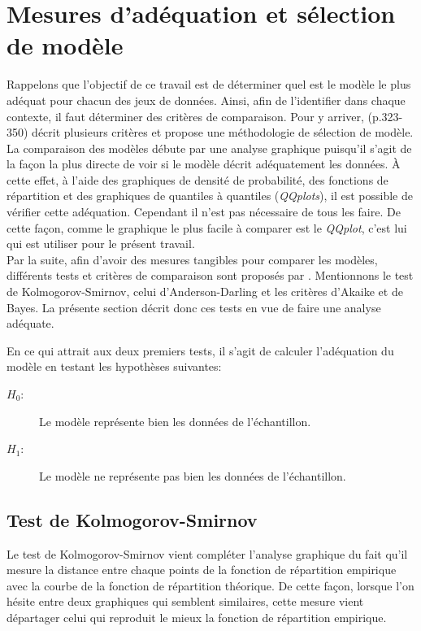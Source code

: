 \section{Mesures d'adéquation et sélection de modèle }\label{Sect_Adequation}	
Rappelons que l'objectif de ce travail est de déterminer quel est le modèle le plus adéquat pour chacun des jeux de données. Ainsi, afin de l'identifier dans chaque contexte, il faut déterminer des critères de comparaison. Pour y arriver, \cite{LossModels_Klugman2012}(p.323-350) décrit plusieurs critères et propose une méthodologie de sélection de modèle.\\

La comparaison des modèles débute par une analyse graphique puisqu'il s'agit de la façon la plus directe de voir si le modèle décrit adéquatement les données. À cette effet, à l'aide des graphiques de densité de probabilité, des fonctions de répartition et des graphiques de quantiles à quantiles (\textit{QQplots}), il est possible de vérifier cette adéquation. Cependant il n'est pas nécessaire de tous les faire. De cette façon, comme le graphique le plus facile à comparer est le \textit{QQplot}, c'est lui qui est utiliser pour le présent travail.\\

Par la suite, afin d'avoir des mesures tangibles pour comparer les modèles, différents tests et critères de comparaison sont proposés par \cite{LossModels_Klugman2012}. Mentionnons le test de Kolmogorov-Smirnov, celui d'Anderson-Darling et les critères d'Akaike et de Bayes. La présente section décrit donc ces tests en vue de faire une analyse adéquate.

En ce qui attrait aux deux premiers tests, il s'agit de calculer l'adéquation du modèle en testant les hypothèses suivantes:
\begin{description}
	\item[$H_0$:] Le modèle représente bien les données de l'échantillon.
	\item[$H_1$:] Le modèle ne représente pas bien les données de l'échantillon.\\
\end{description}

\subsection{Test de Kolmogorov-Smirnov}
Le test de Kolmogorov-Smirnov vient compléter l'analyse graphique du fait qu'il mesure la distance entre chaque points de la fonction de répartition empirique avec la courbe de la fonction de répartition théorique. De cette façon, lorsque l'on hésite entre deux graphiques qui semblent similaires, cette mesure vient départager celui qui reproduit le mieux la fonction de répartition empirique.

